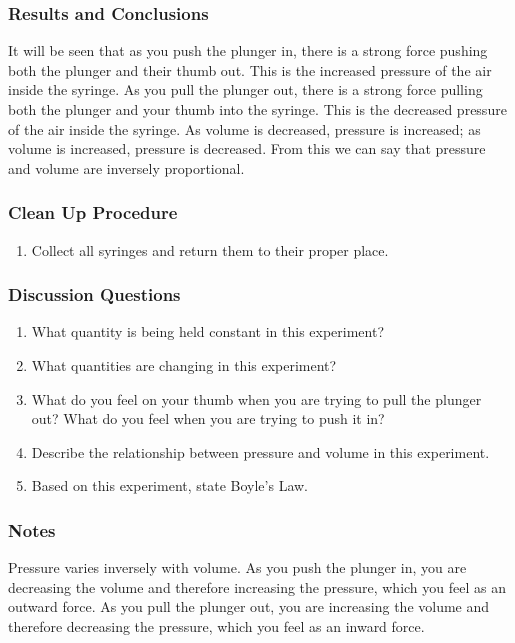 \subsubsection*{Results and Conclusions}
It will be seen that as you push the plunger in, there is a strong force pushing both the plunger and their thumb out.  This is the increased pressure of the air inside the syringe.  As you pull the plunger out, there is a strong force pulling both the plunger and your thumb into the syringe. This is the decreased pressure of the air inside the syringe.  As volume is decreased, pressure is increased; as volume is increased, pressure is decreased.  From this we can say that pressure and volume are inversely proportional.  

\subsubsection*{Clean Up Procedure}
\begin{enumerate}
\item{Collect all syringes and return them to their proper place.} 
\end{enumerate}

\subsubsection*{Discussion Questions}
\begin{enumerate}
\item{What quantity is being held constant in this experiment?}
\item{What quantities are changing in this experiment?}
\item{What do you feel on your thumb when you are trying to pull the plunger out? What do you feel when you are trying to push it in?}
\item{Describe the relationship between pressure and volume in this experiment.} 
\item{Based on this experiment, state Boyle's Law.} 
\end{enumerate}

\subsubsection*{Notes}
Pressure varies inversely with volume. As you push the plunger in, you are decreasing the volume and therefore increasing the pressure, which you feel as an outward force.  
As you pull the plunger out, you are increasing the volume and therefore decreasing the pressure, which you feel as an inward force.  


